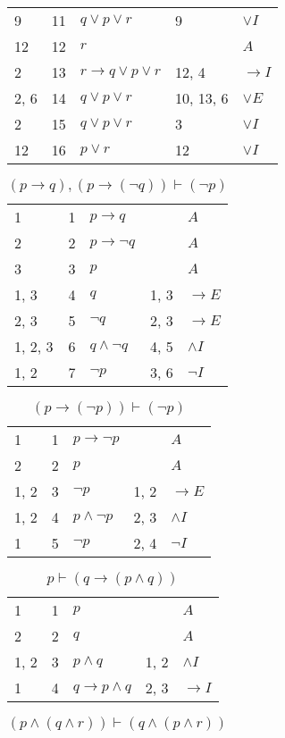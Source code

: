 \documentclass{article}
\begin{document}
\begin{table}[htbp]
\begin{tabular}{lrlll}
{9} & 11 & $q∨p∨r$ & {9} & $∨I$ \\
{12} & 12 & $r$ & {} & $A$ \\
{2} & 13 & $r→q∨p∨r$ & {12, 4} & $→I$ \\
{2, 6} & 14 & $q∨p∨r$ & {10, 13, 6} & $∨E$ \\
{2} & 15 & $q∨p∨r$ & {3} & $∨I$ \\
{12} & 16 & $p∨r$ & {12} & $∨I$ \\
\end{tabular}
\end{table}\begin{table}[htbp]\caption*{$(p→q),(p→(¬q)) ⊢ (¬p)$}\centering\begin{tabular}{lrlll}
{1} & 1 & $p→q$ & {} & $A$ \\
{2} & 2 & $p→ ¬q$ & {} & $A$ \\
{3} & 3 & $p$ & {} & $A$ \\
{1, 3} & 4 & $q$ & {1, 3} & $→E$ \\
{2, 3} & 5 & $¬q$ & {2, 3} & $→E$ \\
{1, 2, 3} & 6 & $q∧ ¬q$ & {4, 5} & $∧I$ \\
{1, 2} & 7 & $¬p$ & {3, 6} & $¬I$ \\
\end{tabular}
\end{table}\begin{table}[htbp]\caption*{$(p→(¬p)) ⊢ (¬p)$}\centering\begin{tabular}{lrlll}
{1} & 1 & $p→ ¬p$ & {} & $A$ \\
{2} & 2 & $p$ & {} & $A$ \\
{1, 2} & 3 & $¬p$ & {1, 2} & $→E$ \\
{1, 2} & 4 & $p∧ ¬p$ & {2, 3} & $∧I$ \\
{1} & 5 & $¬p$ & {2, 4} & $¬I$ \\
\end{tabular}
\end{table}\begin{table}[htbp]\caption*{$p ⊢ (q→(p∧q))$}\centering\begin{tabular}{lrlll}
{1} & 1 & $p$ & {} & $A$ \\
{2} & 2 & $q$ & {} & $A$ \\
{1, 2} & 3 & $p∧q$ & {1, 2} & $∧I$ \\
{1} & 4 & $q→p∧q$ & {2, 3} & $→I$ \\
\end{tabular}
\end{table}\begin{table}[htbp]\caption*{$(p∧(q∧r)) ⊢ (q∧(p∧r))$}\centering\begin{tabular}{lrlll}

\end{tabular}
\end{table}
\end{document}
